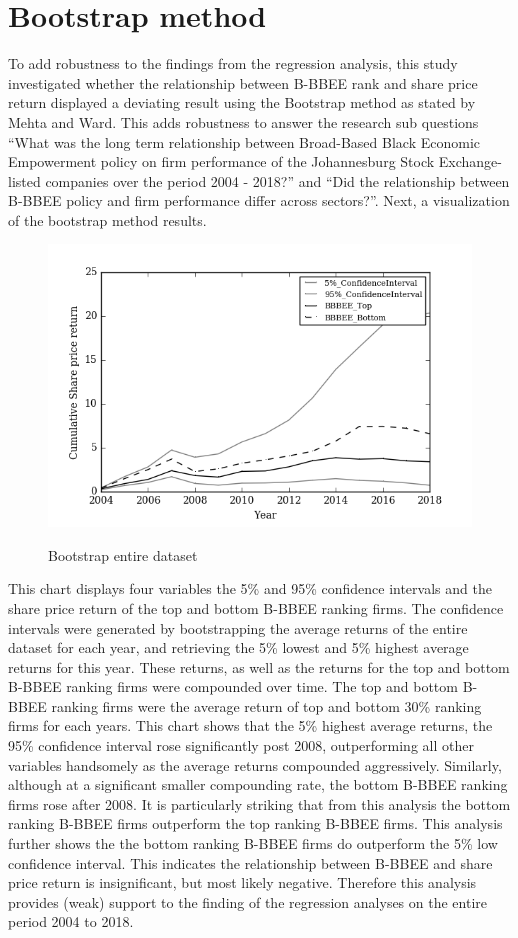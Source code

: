 \section{Bootstrap method}
To add robustness to the findings from the regression analysis, this study investigated whether the relationship between B-BBEE rank and share price return displayed a deviating result using the Bootstrap method as stated by Mehta and Ward. This adds robustness to answer the research sub questions “What was the long term relationship between Broad-Based Black Economic Empowerment policy on firm performance of the Johannesburg Stock Exchange-listed companies over the period 2004 - 2018?” and  “Did the relationship between B-BBEE policy and firm performance differ across sectors?”. Next, a visualization of the bootstrap method results.
\newpage
\begin{figure}[H]
  \centering
  \includegraphics [scale=0.75]{Images/Bootstrap_All.png} \\
  {\small {\it \caption{Bootstrap entire dataset \label{fig:moun} }}}
\end{figure}
This chart displays four variables the 5\% and 95\% confidence intervals and the share price return of the top and bottom B-BBEE ranking firms. The confidence intervals were generated by bootstrapping the average returns of the entire dataset for each year, and retrieving the 5\% lowest and 5\% highest average returns for this year. These returns, as well as the returns for the top and bottom B-BBEE ranking firms were compounded over time. The top and bottom B-BBEE ranking firms were the average return of top and bottom 30\% ranking firms for each years. This chart shows that the 5\% highest average returns, the 95\% confidence interval rose significantly post 2008, outperforming all other variables handsomely as the average returns compounded aggressively. Similarly, although at a significant smaller compounding rate, the bottom B-BBEE ranking firms rose after 2008. It is particularly striking that from this analysis the bottom ranking B-BBEE firms outperform the top ranking B-BBEE firms. This analysis further shows the the bottom ranking B-BBEE firms do outperform the 5\% low confidence interval. This indicates the relationship between B-BBEE and share price return is insignificant, but most likely negative. Therefore this analysis provides (weak) support to the finding of the regression analyses on the entire period 2004 to 2018.

